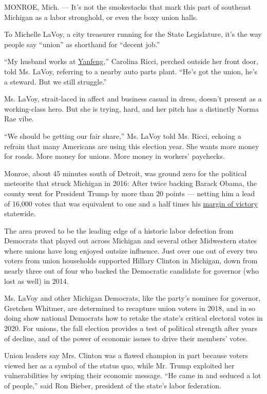 MONROE, Mich. --- It's not the smokestacks that mark this part of
southeast Michigan as a labor stronghold, or even the boxy union halls.

To Michelle LaVoy, a city treasurer running for the State Legislature,
it's the way people say ``union'' as shorthand for ``decent job.''

``My husband works at \href{https://www.yfai.com/}{Yanfeng},'' Carolina
Ricci, perched outside her front door, told Ms. LaVoy, referring to a
nearby auto parts plant. ``He's got the union, he's a steward. But we
still struggle.''

Ms. LaVoy, strait-laced in affect and business casual in dress, doesn't
present as a working-class hero. But she is trying, hard, and her pitch
has a distinctly Norma Rae vibe.

``We should be getting our fair share,'' Ms. LaVoy told Ms. Ricci,
echoing a refrain that many Americans are using this election year. She
wants more money for roads. More money for unions. More money in
workers' paychecks.

Monroe, about 45 minutes south of Detroit, was ground zero for the
political meteorite that struck Michigan in 2016: After twice backing
Barack Obama, the county went for President Trump by more than 20 points
--- netting him a lead of 16,000 votes that was equivalent to one and a
half times his
\href{https://www.nytimes.com/elections/results/michigan}{margin of
victory} statewide.

The area proved to be the leading edge of a historic labor defection
from Democrats that played out across Michigan and several other
Midwestern states where unions have long enjoyed outsize influence. Just
over one out of every two voters from union households supported Hillary
Clinton in Michigan, down from nearly three out of four who backed the
Democratic candidate for governor (who lost as well) in 2014.

Ms. LaVoy and other Michigan Democrats, like the party's nominee for
governor, Gretchen Whitmer, are determined to recapture union voters in
2018, and in so doing show national Democrats how to retake the state's
critical electoral votes in 2020. For unions, the fall election provides
a test of political strength after years of decline, and of the power of
economic issues to drive their members' votes.

Union leaders say Mrs. Clinton was a flawed champion in part because
voters viewed her as a symbol of the status quo, while Mr. Trump
exploited her vulnerabilities by swiping their economic message. ``He
came in and seduced a lot of people,'' said Ron Bieber, president of the
state's labor federation.


